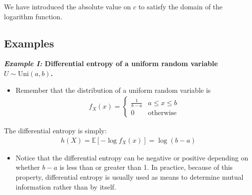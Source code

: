 \documentclass[13pt]{article}
\newcommand{\EE}{\mathbb{E}}
\newcommand{\eq}[1]{\begin{align*}#1\end{align*}}
\begin{document}
We have introduced the absolute value on $c$ to satisfy the domain of the logarithm function.

\subsection{Examples}
\textbf{\textit{Example I:} Differential entropy of a uniform random variable $U \sim \text{Uni}(a, b)$.}
\begin{itemize}
\item Remember that the distribution of a uniform random variable is \eq{f_X(x) = \begin{cases}
\frac{1}{b - a} & a \leq x \leq b \\
0 & \text{otherwise}
\end{cases}}
\end{itemize}
The differential entropy is simply:
 \eq{h(X) = \EE[ - \log f_X (x)] = \log (b - a)}
\begin{itemize}
\item Notice that the differential entropy can be negative or positive depending on whether $b - a$ is less than or greater than 1. In practice, because of this property, differential entropy is usually used as means to determine mutual information rather than by itself.
\end{itemize}
\end{document}
